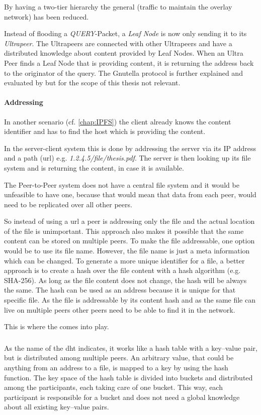 By having a two-tier hierarchy the general  (traffic to maintain the overlay network) has been reduced.

Instead of flooding a \textit{QUERY}-Packet, a \textit{Leaf Node} is now only sending it to its \textit{Ultrapeer}. The Ultrapeers are connected with other Ultrapeers and have a distributed knowledge about content provided by Leaf Nodes. When an Ultra Peer finds a Leaf Node that is providing content, it is returning the address back to the originator of the query. The Gnutella protocol is further explained and evaluated by \citet{gnutellaAnalysis} but for the scope of this thesis not relevant.

\paragraph{Addressing}
In another scenario (cf. \vref{chap:IPFS}) the client already knows the content identifier and has to find the host which is providing the content.

In the server-client system this is done by addressing the server via its IP address and a path (\gls{url}) e.g. \textit{1.2.4.5/file/thesis.pdf}. The server is then looking up its file system and is returning the content, in case it is available.

The Peer-to-Peer system does not have a central file system and it would be unfeasible to have one, because that would mean that data from each peer, would need to be replicated over all other peers.

So instead of using a \gls{url} a peer is addressing only the file and the actual location of the file is unimportant. This approach also makes it possible that the same content can be stored on multiple peers. To make the file addressable, one option would be to use its file name. However, the file name is just a meta information which can be changed. To generate a more unique identifier for a file, a better approach is to create a hash over the file content with a hash algorithm (e.g. SHA-256). As long as the file content does not change, the hash will be always the same. The hash can be used as an address because it is unique for that specific file.
As the file is addressable by its content hash and as the same file can live on multiple peers other peers need to be able to find it in the network.

This is where the  comes into play.

\subsubsection{}\label{sec:p2p-dht}
As the name of the \gls{dht} indicates, it works like a hash table with a key–value pair, but is distributed among multiple peers. An arbitrary value, that could be anything from an address to a file, is mapped to a key by using the hash function. The key space of the hash table is divided into buckets and distributed among the participants, each taking care of one bucket. This way, each participant is responsible for a bucket and does not need a global knowledge about all existing key–value pairs.

